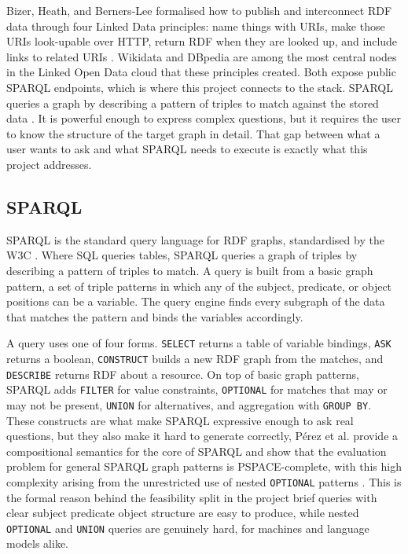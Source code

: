 \documentclass[11pt,a4paper]{article}
\begin{document}
Bizer, Heath, and Berners-Lee formalised how to publish and interconnect RDF data through four Linked Data principles: name things with URIs, make those URIs look-up\-able over HTTP, return RDF when they are looked up, and include links to related URIs \cite{bizer2009linkeddata}. Wikidata and DBpedia are among the most central nodes in the Linked Open Data cloud that these principles created. Both expose public SPARQL endpoints, which is where this project connects to the stack. SPARQL queries a graph by describing a pattern of triples to match against the stored data \cite{w3c2013sparql}. It is powerful enough to express complex questions, but it requires the user to know the structure of the target graph in detail. That gap between what a user wants to ask and what SPARQL needs to execute is exactly what this project addresses.

\subsection{SPARQL}
\label{sec:sparql}

SPARQL is the standard query language for RDF graphs, standardised by
the W3C \cite{w3c2013sparql}. Where SQL queries tables, SPARQL queries
a graph of triples by describing a pattern of triples to match. A
query is built from a basic graph pattern, a set of triple
patterns in which any of the subject, predicate, or object positions
can be a variable. The query engine finds every subgraph of the data
that matches the pattern and binds the variables accordingly.

A query uses one of four forms. \texttt{SELECT} returns a table of
variable bindings, \texttt{ASK} returns a boolean, \texttt{CONSTRUCT}
builds a new RDF graph from the matches, and \texttt{DESCRIBE} returns
RDF about a resource. On top of basic graph patterns, SPARQL adds
\texttt{FILTER} for value constraints, \texttt{OPTIONAL} for matches
that may or may not be present, \texttt{UNION} for alternatives, and
aggregation with \texttt{GROUP BY}. These constructs are what make
SPARQL expressive enough to ask real questions, but they also make it
hard to generate correctly, Pérez et al. provide a compositional semantics for the core of SPARQL and show that the evaluation problem for general SPARQL graph patterns is PSPACE-complete, with this high complexity arising from the unrestricted use of nested \texttt{OPTIONAL} patterns
\cite{perez2009sparql}. This is the formal reason behind the
feasibility split in the project brief queries with clear
subject predicate object structure are easy to produce, while nested
\texttt{OPTIONAL} and \texttt{UNION} queries are genuinely hard, for
machines and language models alike.
\end{document}
